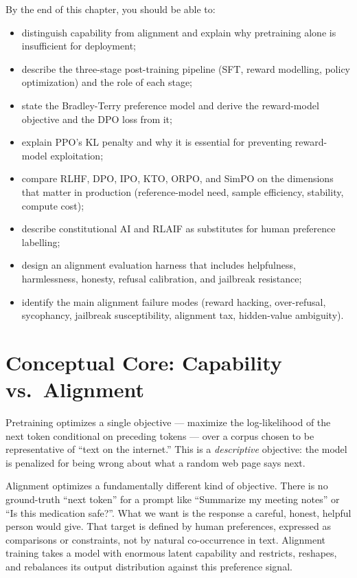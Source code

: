By the end of this chapter, you should be able to:
\begin{itemize}
  \item distinguish capability from alignment and explain why
        pretraining alone is insufficient for deployment;
  \item describe the three-stage post-training pipeline (SFT,
        reward modelling, policy optimization) and the role of each
        stage;
  \item state the Bradley-Terry preference model and derive the
        reward-model objective and the DPO loss from it;
  \item explain PPO's KL penalty and why it is essential for
        preventing reward-model exploitation;
  \item compare RLHF, DPO, IPO, KTO, ORPO, and SimPO on the
        dimensions that matter in production (reference-model need,
        sample efficiency, stability, compute cost);
  \item describe constitutional AI and RLAIF as substitutes for
        human preference labelling;
  \item design an alignment evaluation harness that includes
        helpfulness, harmlessness, honesty, refusal calibration,
        and jailbreak resistance;
  \item identify the main alignment failure modes (reward hacking,
        over-refusal, sycophancy, jailbreak susceptibility,
        alignment tax, hidden-value ambiguity).
\end{itemize}

\section{Conceptual Core: Capability vs.\ Alignment}

Pretraining optimizes a single objective --- maximize the
log-likelihood of the next token conditional on preceding tokens
--- over a corpus chosen to be representative of ``text on the
internet.'' This is a \emph{descriptive} objective: the model is
penalized for being wrong about what a random web page says next.

Alignment optimizes a fundamentally different kind of objective.
There is no ground-truth ``next token'' for a prompt like ``Summarize
my meeting notes'' or ``Is this medication safe?''. What we want is
the response a careful, honest, helpful person would give. That
target is defined by human preferences, expressed as comparisons or
constraints, not by natural co-occurrence in text. Alignment
training takes a model with enormous latent capability and
restricts, reshapes, and rebalances its output distribution against
this preference signal.

